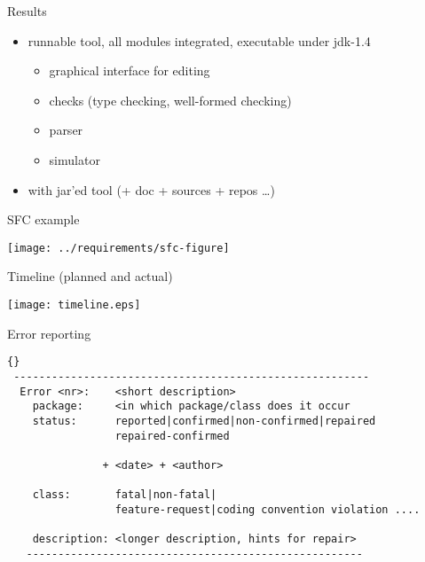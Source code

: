 \begin{myslide}{Results}
  \begin{itemize}
  \item runnable tool, all modules integrated, executable under jdk-1.4
    \begin{itemize}
    \item graphical interface for editing
    \item checks (type checking, well-formed checking)
    \item parser
    \item simulator
    \end{itemize}
  \item {} with jar'ed tool (+ doc + sources + repos
    \ldots)
  \end{itemize}
\end{myslide}


\begin{myslide}{SFC example}
  

\vspace{-1cm}

  \texttt{[image: ../requirements/sfc-figure]}

\end{myslide}






\begin{myslide}{Timeline (planned and actual)}
  \begin{center}
   \texttt{[image: timeline.eps]}  
    \end{center}
\end{myslide}



\begin{myslide}{Error reporting}
  \begin{lstlisting}{}
 --------------------------------------------------------
  Error <nr>:    <short description>
    package:     <in which package/class does it occur
    status:      reported|confirmed|non-confirmed|repaired
                 repaired-confirmed

               + <date> + <author>
   
    class:       fatal|non-fatal|
                 feature-request|coding convention violation ....

    description: <longer description, hints for repair>
   -----------------------------------------------------
  \end{lstlisting}
\end{myslide}




